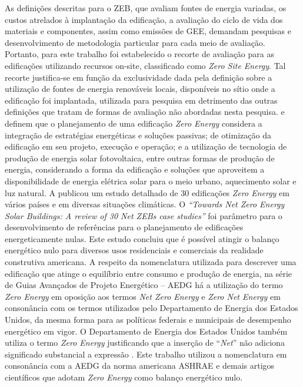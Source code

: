 As definições descritas para o ZEB, que avaliam fontes de energia variadas, os custos atrelados à implantação da edificação, a avaliação do ciclo de vida dos materiais e componentes, assim como emissões de GEE, demandam pesquisas e desenvolvimento de metodologia particular para cada meio de avaliação. Portanto, para este trabalho foi estabelecido o recorte de avaliação para as edificações utilizando recursos on-site, classificado como \textit{Zero Site Energy}. Tal recorte justifica-se em função da exclusividade dada pela definição sobre a utilização de fontes de energia renováveis locais, disponíveis no sítio onde a edificação foi implantada, utilizada para pesquisa em detrimento das outras definições que tratam de formas de avaliação não abordadas nesta pesquisa.\vspace*{0.3cm} \newline
\textcite{Didone2014} e \textcite{Athienitis2015} definem que o planejamento de uma edificação \textit{Zero Energy} considera a integração de estratégias energéticas e soluções passivas; de otimização da edificação em seu projeto, execução e operação; e a utilização de tecnologia de produção de energia solar fotovoltaica, entre outras formas de produção de energia, considerando a forma da edificação e soluções que aproveitem a disponibilidade de energia elétrica solar para o meio urbano, aquecimento solar e luz natural.\vspace*{0.3cm} \newline
A \textcite{InternationalEnergyAgency-IEA2014} publicou um estudo detalhado de 30 edificações \textit{Zero Energy} em vários países e em diversas situações climáticas. O \textit{“Towards Net Zero Energy Solar Buildings: A review of 30 Net ZEBs case studies”} foi parâmetro para o desenvolvimento de referências para o planejamento de edificações energeticamente nulas. Este estudo concluiu que é possível atingir o balanço energético nulo para diversos usos residenciais e comerciais da realidade construtiva americana.\vspace*{0.3cm} \newline
A respeito da nomenclatura utilizada para descrever uma edificação que atinge o equilíbrio entre consumo e produção de energia, na série de Guias Avançados de Projeto Energético – AEDG \cite{AmericanSocietyofHeatingRefrigeratingandAir-ConditioningEngineers-ASHRAE2019} há a utilização do termo \textit{Zero Energy} em oposição aos termos \textit{Net Zero Energy} e \textit{Zero Net Energy} em consonância com os termos utilizados pelo Departamento de Energia dos Estados Unidos, da mesma forma para as políticas federais e municipais de desempenho energético em vigor. O Departamento de Energia dos Estados Unidos também utiliza o termo \textit{Zero Energy} justificando que a inserção de “\textit{Net}” não adiciona significado substancial a expressão \cite{U.S.DepartmentofEnergy-USDOE2015a}. Este trabalho utilizou a nomenclatura em consonância com a AEDG da norma americana ASHRAE e demais artigos científicos que adotam \textit{Zero Energy} como balanço energético nulo.


